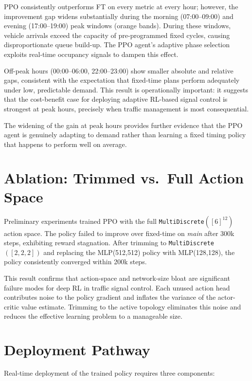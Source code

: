 \documentclass[12pt,oneside,a4paper]{report}
\newcommand{\ppo}{\textsc{PPO}}
\newcommand{\ft}{\textsc{FT}}
\begin{document}
\ppo{} consistently outperforms \ft{} on every metric at every
hour; however, the improvement gap widens substantially during
the morning (07:00--09:00) and evening (17:00--19:00) peak windows
(orange bands).  During these windows, vehicle arrivals exceed
the capacity of pre-programmed fixed cycles, causing
disproportionate queue build-up.  The \ppo{} agent's adaptive
phase selection exploits real-time occupancy signals to dampen
this effect.

Off-peak hours (00:00--06:00, 22:00--23:00) show smaller absolute
and relative gaps, consistent with the expectation that fixed-time
plans perform adequately under low, predictable demand.  This
result is operationally important: it suggests that the cost-benefit
case for deploying adaptive RL-based signal control is strongest at
peak hours, precisely when traffic management is most consequential.

The widening of the gain at peak hours provides further evidence
that the \ppo{} agent is genuinely adapting to demand rather than
learning a fixed timing policy that happens to perform well on
average.

\section{Ablation: Trimmed vs.\ Full Action Space}
\label{sec:res_ablation}

Preliminary experiments trained PPO with the full
\texttt{MultiDiscrete}$([6]^{12})$ action space.  The policy failed
to improve over fixed-time on \textit{main} after 300k steps,
exhibiting reward stagnation.  After trimming to
\texttt{MultiDiscrete}$([2,2,2])$ and replacing the MLP(512,512)
policy with MLP(128,128), the policy consistently converged within
200k steps.

This result confirms that action-space and network-size bloat are
significant failure modes for deep RL in traffic signal control.
Each unused action head contributes noise to the policy gradient
and inflates the variance of the actor-critic value estimate.
Trimming to the active topology eliminates this noise and reduces
the effective learning problem to a manageable size.

\section{Deployment Pathway}
\label{sec:disc_deploy}

Real-time deployment of the trained policy requires three
components:
\end{document}
